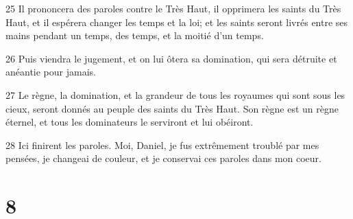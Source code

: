 \par 25 Il prononcera des paroles contre le Très Haut, il opprimera les saints du Très Haut, et il espérera changer les temps et la loi; et les saints seront livrés entre ses mains pendant un temps, des temps, et la moitié d'un temps.
\par 26 Puis viendra le jugement, et on lui ôtera sa domination, qui sera détruite et anéantie pour jamais.
\par 27 Le règne, la domination, et la grandeur de tous les royaumes qui sont sous les cieux, seront donnés au peuple des saints du Très Haut. Son règne est un règne éternel, et tous les dominateurs le serviront et lui obéiront.
\par 28 Ici finirent les paroles. Moi, Daniel, je fus extrêmement troublé par mes pensées, je changeai de couleur, et je conservai ces paroles dans mon coeur.

\chapter{8}

